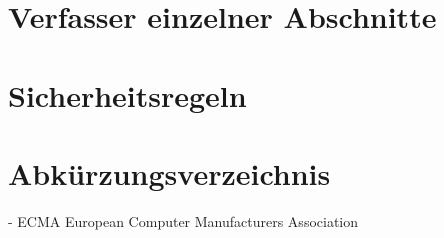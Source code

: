 \documentclass[11pt,a4paper]{article}
\begin{document}
\section{Verfasser einzelner Abschnitte}

\clearpage
\section{Sicherheitsregeln}

\clearpage

\section*{Abkürzungsverzeichnis}

- ECMA European Computer Manufacturers Association

\newpage


\clearpage
\end{document}
